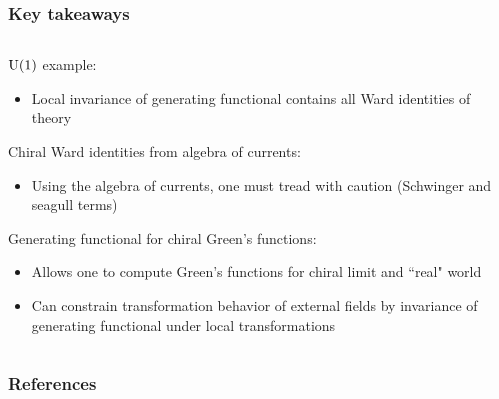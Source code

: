 \documentclass[accentcolor=tud2c,usenames,dvipsnames,colorbacktitle,inverttitle,landscape,german,presentation,t]{tudbeamer}
\begin{document}
  \begin{frame}
    \frametitle{Key takeaways}
    \begin{columns}[c]
      \begin{column}{0.8\textwidth}
        $\textrm{U}(1)$ example:
        \begin{itemize}
          \item Local invariance of generating functional contains all Ward identities of theory
        \end{itemize}

        Chiral Ward identities from algebra of currents:
        \begin{itemize}
          \item Using the algebra of currents, one must tread with caution (Schwinger and seagull terms)
        \end{itemize}

        Generating functional for chiral Green's functions:
        \begin{itemize}
          \item Allows one to compute Green's functions for chiral limit and ``real" world
          \item Can constrain transformation behavior of external fields by invariance of generating functional under local transformations
        \end{itemize}
      \end{column}


    \end{columns}
  \end{frame}





  \begin{frame}[allowframebreaks]
    \frametitle{References}
    
    
  \end{frame}
\end{document}
